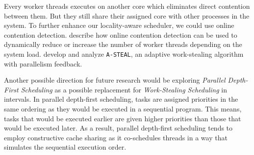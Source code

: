 Every worker threads executes on another core which eliminates direct
contention between them. But they still share their assigned core with
other processes in the system. To further enhance our locality-aware
scheduler, we could use online contention
detection. \textcite{Mars2010} describe how online contention
detection can be used to dynamically reduce or increase the number of
worker threads depending on the system load. \textcite{Agrawal2007}
develop and analyze \lstinline!A-STEAL!, an adaptive work-stealing
algorithm with parallelism feedback.

Another possible direction for future research would be exploring
\emph{Parallel Depth-First Scheduling} as a possible replacement for
\emph{Work-Stealing Scheduling} in intervals. In parallel depth-first
scheduling, tasks are assigned priorities in the same ordering as they
would be executed in a sequential program. This means, tasks that
would be executed earlier are given higher priorities than those that
would be executed later. As a result, parallel depth-first scheduling
tends to employ constructive cache sharing \cite{Liaskovitis2006,
  Chen2007} as it co-schedules threads in a way that simulates the
sequential execution order.


